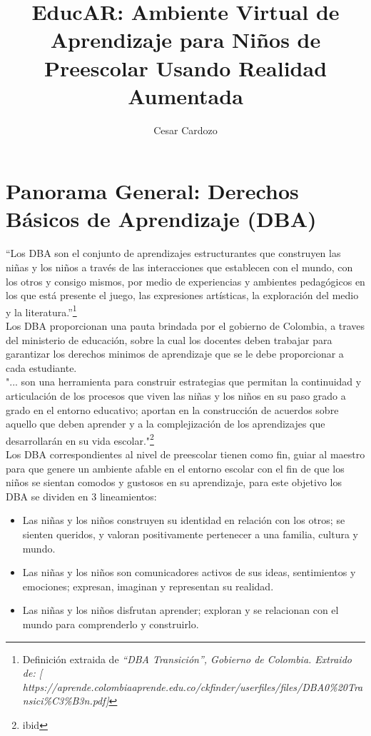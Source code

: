 \documentclass[12pt,letterpaper]{article}
\author{Cesar Cardozo}
\title{EducAR: Ambiente Virtual de Aprendizaje para Niños de Preescolar Usando Realidad Aumentada}
\begin{document}
\maketitle
\section{Panorama General: Derechos Básicos de Aprendizaje (DBA)}
“Los DBA son el conjunto de aprendizajes estructurantes que construyen las niñas y los niños a través de las interacciones que establecen con el mundo, con los otros y consigo mismos, por medio de experiencias y ambientes pedagógicos en los que está presente el juego, las expresiones artísticas, la exploración del medio y la literatura.”\footnote{Definición extraida de \textit{“DBA Transición”, Gobierno de Colombia. Extraido de: [ https://aprende.colombiaaprende.edu.co/ckfinder/userfiles/files/DBA0\%20Transici\%C3\%B3n.pdf]}}\\

Los DBA proporcionan una pauta brindada por el gobierno de Colombia, a traves del ministerio de educación, sobre la cual los docentes deben trabajar para garantizar los derechos minimos de aprendizaje que se le debe proporcionar a cada estudiante.\\

"... son una herramienta para construir estrategias que permitan la continuidad y articulación de los procesos que viven las niñas y los niños en su paso grado a grado en el entorno educativo; aportan en la construcción de acuerdos sobre aquello que deben aprender y a la complejización de los aprendizajes que desarrollarán en su vida escolar."\footnote{ibid}\\

Los DBA correspondientes al nivel de preescolar tienen como fin, guiar al maestro para que genere un ambiente afable en el entorno escolar con el fin de que los niños se sientan comodos y gustosos en su aprendizaje, para este objetivo los DBA se dividen en 3 lineamientos:

\begin{itemize}
\item Las niñas y los niños construyen su identidad en relación con los otros; se sienten queridos, y valoran positivamente pertenecer a una familia, cultura y mundo.
\item Las niñas y los niños son comunicadores activos de sus ideas, sentimientos y emociones; expresan, imaginan y representan su realidad.
\item Las niñas y los niños disfrutan aprender; exploran y se relacionan con el mundo para comprenderlo y construirlo.
\end{itemize}
\end{document}
